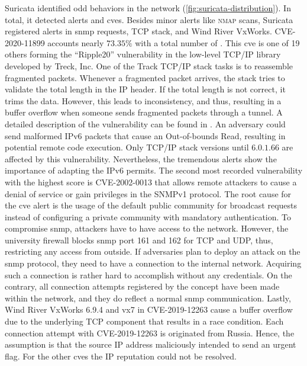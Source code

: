 Suricata identified odd behaviors in the network (\autoref{fig:suricata-distribution}).
In total, it detected  alerts and \acsp{cve}.
Besides minor alerts like \textsc{nmap} scans, Suricata registered alerts in \ac{snmp} requests, TCP stack, and Wind River VxWorks.
CVE-2020-11899 \cite{CVE-2020-11899} accounts nearly $73.35\%$ with a total number of .
This \acs{cve} is one of 19 others forming the \enquote{Ripple20} vulnerability in the low-level TCP/IP library developed by Treck, Inc.
One of the Track TCP/IP stack tasks is to reassemble fragmented packets.
Whenever a fragmented packet arrives, the stack tries to validate the total length in the IP header.
If the total length is not correct, it trims the data.
However, this leads to inconsistency, and thus, resulting in a buffer overflow when someone sends fragmented packets through a tunnel.
A detailed description of the vulnerability can be found in \cite{ripple20}.
An adversary could send malformed IPv6 packets that cause an Out-of-bounds Read, resulting in potential remote code execution.
Only TCP/IP stack versions until $6.0.1.66$ are affected by this vulnerability.
Nevertheless, the tremendous alerts show the importance of adapting the IPv6 permits.
The second most recorded vulnerability with the highest score is CVE-2002-0013 \cite{CVE-2002-0013} that allows remote attackers to cause a denial of service or gain privileges in the SNMPv1 protocol.
The root cause for the \acs{cve} alert is the usage of the default public community for broadcast requests instead of configuring a private community with mandatory authentication.
To compromise \ac{snmp}, attackers have to have access to the network.
However, the university firewall blocks \ac{snmp} port 161 and 162 for TCP and UDP, thus, restricting any access from outside.
If adversaries plan to deploy an attack on the \ac{snmp} protocol, they need to have a connection to the internal network.
Acquiring such a connection is rather hard to accomplish without any credentials.
On the contrary, all connection attempts registered by the concept have been made within the network, and they do reflect a normal \ac{snmp} communication.
Lastly, Wind River VxWorks 6.9.4 and vx7 in CVE-2019-12263 \cite{CVE-2019-12263} cause a buffer overflow due to the underlying TCP component that results in a race condition.
Each connection attempt with CVE-2019-12263 is originated from Russia.
Hence, the assumption is that the source IP address maliciously intended to send an urgent flag.
For the other \acsp{cve} the IP reputation could not be resolved.

